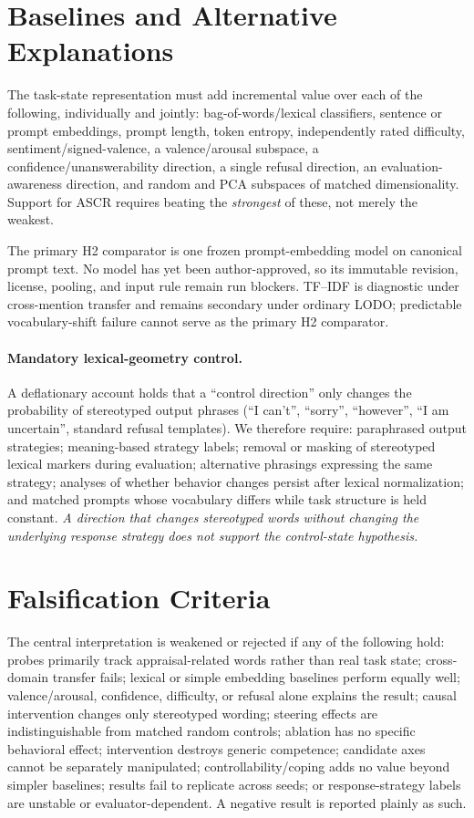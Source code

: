 \documentclass[11pt]{article}
\newcommand{\ascr}{ASCR}
\begin{document}
\section{Baselines and Alternative Explanations}
\label{sec:baselines}

The task-state representation must add incremental value over each of the
following, individually and jointly: bag-of-words/lexical classifiers, sentence or
prompt embeddings, prompt length, token entropy, independently rated difficulty,
sentiment/signed-valence, a valence/arousal subspace, a confidence/unanswerability
direction, a single refusal direction, an evaluation-awareness direction, and
random and PCA subspaces of matched dimensionality. Support for \ascr{} requires
beating the \emph{strongest} of these, not merely the weakest.

The primary H2 comparator is one frozen prompt-embedding model on canonical prompt
text. No model has yet been author-approved, so its immutable revision, license,
pooling, and input rule remain run blockers. TF--IDF is diagnostic under
cross-mention transfer and remains secondary under ordinary LODO; predictable
vocabulary-shift failure cannot serve as the primary H2 comparator.

\paragraph{Mandatory lexical-geometry control.}
A deflationary account holds that a ``control direction'' only changes the
probability of stereotyped output phrases (``I can't'', ``sorry'', ``however'',
``I am uncertain'', standard refusal templates). We therefore require:
paraphrased output strategies; meaning-based strategy labels; removal or masking of
stereotyped lexical markers during evaluation; alternative phrasings expressing the
same strategy; analyses of whether behavior changes persist after lexical
normalization; and matched prompts whose vocabulary differs while task structure is
held constant. \emph{A direction that changes stereotyped words without changing
the underlying response strategy does not support the control-state hypothesis.}

\section{Falsification Criteria}
\label{sec:falsification}

The central interpretation is weakened or rejected if any of the following hold:
probes primarily track appraisal-related words rather than real task state;
cross-domain transfer fails; lexical or simple embedding baselines perform equally
well; valence/arousal, confidence, difficulty, or refusal alone explains the
result; causal intervention changes only stereotyped wording; steering effects are
indistinguishable from matched random controls; ablation has no specific behavioral
effect; intervention destroys generic competence; candidate axes cannot be
separately manipulated; controllability/coping adds no value beyond simpler
baselines; results fail to replicate across seeds; or response-strategy labels are
unstable or evaluator-dependent. A negative result is reported plainly as such.
\end{document}

